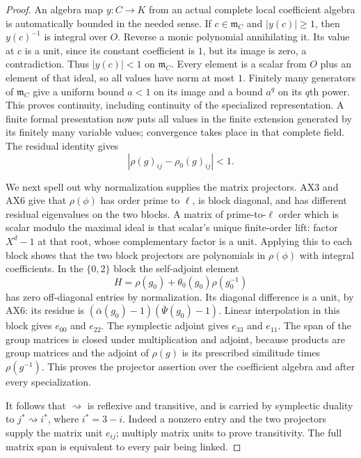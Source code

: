\begin{proof}
An algebra map $y:C\to K$ from an actual complete local
coefficient algebra is automatically bounded in the
needed sense.  If $c\in\mathfrak m_C$ and $|y(c)|\ge1$,
then $y(c)^{-1}$ is integral over $O$.  Reverse a monic
polynomial annihilating it.  Its value at $c$ is a unit,
since its constant coefficient is $1$, but its image is
zero, a contradiction.  Thus $|y(c)|<1$ on
$\mathfrak m_C$.  Every element is a scalar from $O$
plus an element of that ideal, so all values have norm
at most $1$.  Finitely many generators of
$\mathfrak m_C$ give a uniform bound $a<1$ on its
image and a bound $a^q$ on its $q$th power.  This
proves continuity, including continuity of the
specialized representation.  A finite formal
presentation now puts all values in the finite
extension generated by its finitely many variable
values; convergence takes place in that complete
field.  The residual identity gives
\[
                  |\rho(g)_{ij}-\rho_0(g)_{ij}|<1.
 \tag{PX.15}
\]

We next spell out why normalization supplies the
matrix projectors.  AX3 and AX6 give that
$\rho(\phi)$ has order prime to $\ell$, is block
diagonal, and has different residual eigenvalues
on the two blocks.  A matrix of prime-to-$\ell$
order which is scalar modulo the maximal ideal
is that scalar's unique finite-order lift:
factor $X^d-1$ at that root, whose complementary
factor is a unit.  Applying this to each block
shows that the two block projectors are
polynomials in $\rho(\phi)$ with integral
coefficients.  In the $\{0,2\}$ block the
self-adjoint element
\[
 H=\rho(g_0)+\theta_0(g_0)\rho(g_0^{-1})
 \tag{PX.16}
\]
has zero off-diagonal entries by normalization.
Its diagonal difference is a unit, by AX6:
its residue is
$(\bar\alpha(g_0)-1)(\bar\Psi(g_0)-1)$.
Linear interpolation in this block gives $e_{00}$
and $e_{22}$.  The symplectic adjoint gives
$e_{33}$ and $e_{11}$.  The span of the group
matrices is closed under multiplication and
adjoint, because products are group matrices
and the adjoint of $\rho(g)$ is its prescribed
similitude times $\rho(g^{-1})$.  This proves
the projector assertion over the coefficient
algebra and after every specialization.

It follows that $\rightsquigarrow$ is reflexive
and transitive, and is carried by symplectic
duality to $j^*\rightsquigarrow i^*$, where
$i^*=3-i$.  Indeed a nonzero entry and the
two projectors supply the matrix unit $e_{ij}$;
multiply matrix units to prove transitivity.
The full matrix span is equivalent to every
pair being linked.


\end{proof}
